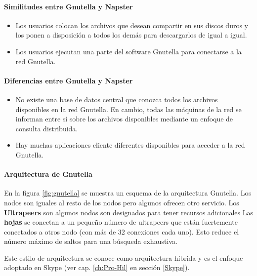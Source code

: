  \paragraph{Similitudes entre Gnutella y Napster}
 \begin{itemize}
 	\item  Los usuarios colocan los archivos que desean compartir en sus discos duros y los ponen a disposición  a todos los demás para descargarlos de igual a igual.
 	\item Los usuarios ejecutan una parte del software Gnutella para conectarse a la red Gnutella.
 \end{itemize}
 
 \paragraph{Diferencias entre Gnutella y Napster}
 \begin{itemize}
 	\item No existe una base de datos central que conozca todos los archivos disponibles en la red Gnutella. En cambio, todas las máquinas de la red se informan entre sí sobre los archivos disponibles mediante un enfoque de consulta distribuida.
 	\item Hay muchas aplicaciones cliente diferentes disponibles para acceder a la red Gnutella.
 \end{itemize}
 
 \paragraph{Arquitectura de Gnutella}
 
 En la figura \ref{fig:gnutella} se muestra un esquema de la arquitectura Gnutella.
 Los nodos son iguales al resto de los nodos pero algunos ofrecen otro servicio. 
 Los \textbf{Ultrapeers} son  algunos nodos son designados para tener recursos adicionales
 Las \textbf{hojas}  se conectan a un pequeño número de ultrapeers que están fuertemente conectados a otros nodo (con más de 32 conexiones cada uno).
 Esto reduce el número máximo de saltos para una búsqueda exhaustiva.
 
 Este estilo de arquitectura se conoce como  arquitectura híbrida y es el enfoque adoptado en Skype (ver cap. \ref{ch:Pro-Hil} en secci\'on \ref{Skype}).
 
 
 
